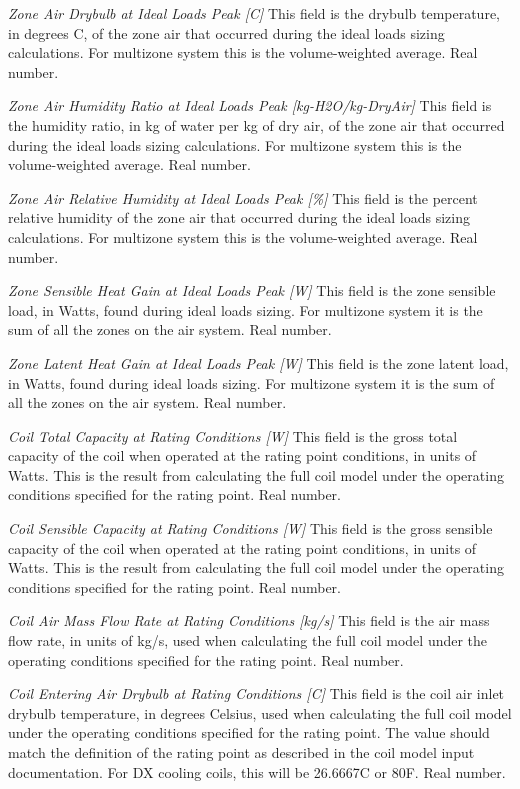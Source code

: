 \emph{Zone Air Drybulb at Ideal Loads Peak [C]}  This field is the drybulb temperature, in degrees C, of the zone air that occurred during the ideal loads sizing calculations. For multizone system this is the volume-weighted average. Real number.

\emph{Zone Air Humidity Ratio at Ideal Loads Peak [kg-H2O/kg-DryAir]}  This field is the humidity ratio, in kg of water per kg of dry air, of the zone air that occurred during the ideal loads sizing calculations. For multizone system this is the volume-weighted average. Real number.

\emph{Zone Air Relative Humidity at Ideal Loads Peak [\%]}  This field is the percent relative humidity of the zone air that occurred during the ideal loads sizing calculations. For multizone system this is the volume-weighted average. Real number.

\emph{Zone Sensible Heat Gain at Ideal Loads Peak [W]}  This field is the zone sensible load, in Watts, found during ideal loads sizing.  For multizone system it is the sum of all the zones on the air system. Real number.

\emph{Zone Latent Heat Gain at Ideal Loads Peak [W]}  This field is the zone latent load, in Watts, found during ideal loads sizing.  For multizone system it is the sum of all the zones on the air system. Real number.

\emph{Coil Total Capacity at Rating Conditions [W]}  This field is the gross total capacity of the coil when operated at the rating point conditions, in units of Watts.  This is the result from calculating the full coil model under the operating conditions specified for the rating point.  Real number.

\emph{Coil Sensible Capacity at Rating Conditions [W]}  This field is the gross sensible capacity of the coil when operated at the rating point conditions, in units of Watts.  This is the result from calculating the full coil model under the operating conditions specified for the rating point.  Real number.

\emph{Coil Air Mass Flow Rate at Rating Conditions [kg/s]}  This field is the air mass flow rate, in units of kg/s, used when calculating the full coil model under the operating conditions specified for the rating point.  Real number.

\emph{Coil Entering Air Drybulb at Rating Conditions [C]}  This field is the coil air inlet drybulb temperature, in degrees Celsius, used when calculating the full coil model under the operating conditions specified for the rating point.  The value should match the definition of the rating point as described in the coil model input documentation.  For DX cooling coils, this will be 26.6667C or 80F.  Real number.


